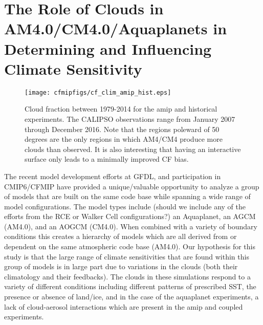 \documentclass[11pt]{article}   	%
\begin{document}
\section{The Role of Clouds in AM4.0/CM4.0/Aquaplanets in Determining and Influencing Climate Sensitivity}


\begin{figure}
  \texttt{[image: cfmipfigs/cf\_clim\_amip\_hist.eps]}
  \caption{Cloud fraction between 1979-2014 for the amip and historical experiments.  The CALIPSO
  observations range from January 2007 through December 2016.  Note that the regions poleward of
  50 degrees are the only regions in which AM4/CM4 produce more clouds than observed.  It is 
  also interesting that having an interactive surface only leads to a minimally improved CF bias.}
  \label{fig:calipso_amip_comparison}
\end{figure}


The recent model development efforts at GFDL, and participation in CMIP6/CFMIP have provided a 
unique/valuable opportunity to analyze a group of models that are built on the same code base while 
spanning a wide range of model configurations.  The model types include (should we include any of the
efforts from the RCE or Walker Cell configurations?) an Aquaplanet, an AGCM (AM4.0), 
and an AOGCM (CM4.0).  When combined with a variety of boundary conditions this creates a hierarchy of
models which are all derived from or dependent on the same atmospheric code base (AM4.0).  
Our hypothesis for this study is that the large range of climate sensitivities that are found within this 
group of models is in large part due to variations in the clouds (both their climatology and their feedbacks).
The clouds in these simulations respond to a variety of different conditions including different
patterns of prescribed SST, the presence or absence of land/ice, and in the case of the aquaplanet
experiments, a lack of cloud-aerosol interactions which are present in the amip and coupled experiments.  
\end{document}
